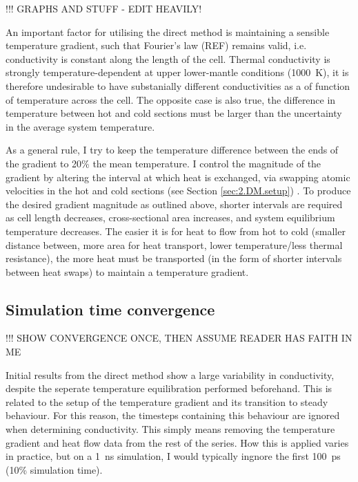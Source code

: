 !!! GRAPHS AND STUFF - EDIT HEAVILY!

An important factor for utilising the direct method is maintaining a sensible temperature gradient, such that Fourier's law (REF) remains valid, i.e. conductivity is constant along the length of the cell. Thermal conductivity is strongly temperature-dependent at upper lower-mantle conditions (1000~K), it is therefore undesirable to have substanially different conductivities as a of function of temperature across the cell. The opposite case is also true, the difference in temperature between hot and cold sections must be larger than the uncertainty in the average system temperature. 

As a general rule, I try to keep the temperature difference between the ends of the gradient to 20\% the mean temperature. I control the magnitude of the gradient by altering the interval at which heat is exchanged, via swapping atomic velocities in the hot and cold sections (see Section \ref{sec:2.DM.setup}) . To produce the desired gradient magnitude as outlined above, shorter intervals are required as cell length decreases, cross-sectional area increases, and system equilibrium temperature decreases. The easier it is for heat to flow from hot to cold (smaller distance between, more area for heat transport, lower temperature/less thermal resistance), the more heat must be transported (in the form of shorter intervals between heat swaps) to maintain a temperature gradient.


\subsection{\label{sec:3.DM.time}Simulation time convergence}

!!! SHOW CONVERGENCE ONCE, THEN ASSUME READER HAS FAITH IN ME

Initial results from the direct method show a large variability in conductivity, despite the seperate temperature equilibration performed beforehand. This is related to the setup of the temperature gradient and its transition to steady behaviour. For this reason, the timesteps containing this behaviour are ignored when determining conductivity. This simply means removing the temperature gradient and heat flow data from the rest of the series. How this is applied varies in practice, but on a 1~ns simulation, I would typically ingnore the first 100~ps (10\% simulation time).

